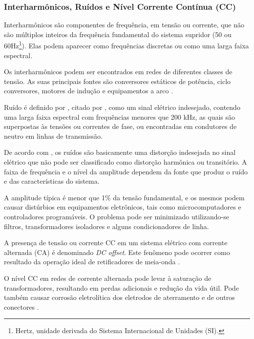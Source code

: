 \subsubsection{Interharmônicos, Ruídos e Nível Corrente Contínua (CC)}
\par
Interharmônicos são componentes de frequência, em tensão ou corrente, que não são múltiplos inteiros da frequência fundamental do sistema supridor (50 ou 60Hz\footnote{Hertz, unidade derivada do Sistema Internacional de Unidades (SI).}). Elas podem aparecer como frequências discretas ou como uma larga faixa espectral.
\par
Os interharmônicos podem ser encontrados em redes de diferentes classes de tensão. As suas principais fontes são conversores estáticos de potência, ciclo conversores, motores de indução e equipamentos a arco \cite{DEL03}.
\par
Ruído é definido por \cite{OLIVE}, citado por \cite{DEL03}, como um sinal elétrico indesejado, contendo uma larga faixa espectral com frequências menores que 200 kHz, as quais são superpostas às tensões ou correntes de fase, ou encontradas em condutores de neutro em linhas de transmissão.
\par
De acordo com \cite{DUG96}, os ruídos são basicamente uma distorção indesejada no sinal elétrico que não pode ser classificado como distorção harmônica ou transitório. A faixa de frequência e o nível da amplitude dependem da fonte que produz o ruído e das características do sistema. 
\par
A amplitude típica é menor que 1\% da tensão fundamental, e os mesmos podem causar distúrbios em equipamentos eletrônicos, tais como microcomputadores e controladores programáveis. O problema pode ser minimizado utilizando-se filtros, transformadores isoladores e alguns condicionadores de linha.
\par
A presença de tensão ou corrente CC em um sistema elétrico com corrente alternada (CA) é denominado \emph{DC offset}. Este fenômeno pode ocorrer como resultado da operação ideal de retificadores de meia-onda \cite{OLIVE}.
\par
O nível CC em redes de corrente alternada pode levar à saturação de transformadores, resultando em perdas adicionais e redução da vida útil. Pode também causar corrosão eletrolítica dos eletrodos de aterramento e de outros conectores \cite{DEL03}.
